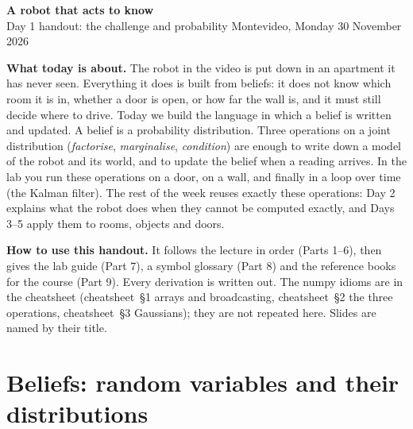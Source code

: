 \documentclass[11pt]{article}
\newcommand{\cs}[1]{cheatsheet~\S#1}
\begin{document}
{\LARGE\bfseries A robot that acts to know}\\[0.2em]
{\Large Day 1 handout: the challenge and probability}\hfill{\small\color{muted} Montevideo, Monday 30 November 2026}

\vspace{0.6em}
\textbf{What today is about.}
The robot in the video is put down in an apartment it has never seen. Everything it does is built from beliefs:
it does not know which room it is in, whether a door is open, or how far the wall is, and it must still decide where to drive.
Today we build the language in which a belief is written and updated. A belief is a probability distribution.
Three operations on a joint distribution (\emph{factorise}, \emph{marginalise}, \emph{condition}) are enough to write down a model of the robot and its world,
and to update the belief when a reading arrives. In the lab you run these operations on a door, on a wall, and finally in a loop over time (the Kalman filter).
The rest of the week reuses exactly these operations: Day 2 explains what the robot does when they cannot be computed exactly,
and Days 3--5 apply them to rooms, objects and doors.

\textbf{How to use this handout.} It follows the lecture in order (Parts 1--6), then gives the lab guide (Part 7), a symbol glossary (Part 8) and the reference books for the course (Part 9).
Every derivation is written out. The numpy idioms are in the cheatsheet (\cs{1} arrays and broadcasting, \cs{2} the three operations, \cs{3} Gaussians); they are not repeated here.
Slides are named by their title.

\section{Beliefs: random variables and their distributions}
\end{document}
